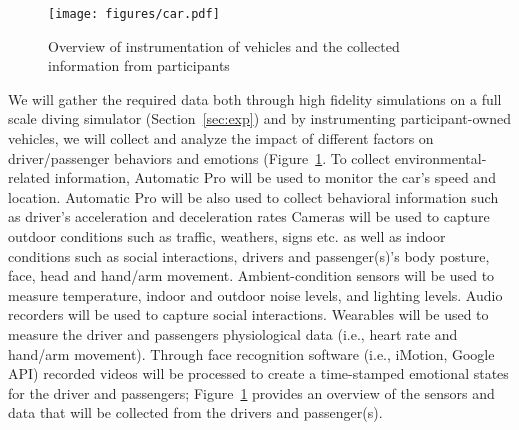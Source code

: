 \begin{figure}
    \centering
    \texttt{[image: figures/car.pdf]}
    \caption{Overview of instrumentation of vehicles and the collected information from participants}
    \label{fig:sensors}
\end{figure}
We will gather the required data both through high fidelity simulations on a full scale diving simulator (Section~\ref{sec:exp}) and by instrumenting participant-owned vehicles, we will collect and analyze the impact of different factors on driver/passenger behaviors and emotions (Figure~\ref{fig:sensors}.
To collect environmental-related information, Automatic Pro will be used to monitor the car's speed and location. 
Automatic Pro will be also used to collect behavioral information such as driver's acceleration and deceleration rates
Cameras will be used to capture outdoor conditions such as traffic, weathers, signs etc. as well as indoor conditions such as social interactions, drivers and passenger(s)'s body posture, face, head and hand/arm movement. 
Ambient-condition sensors will be used to measure temperature, indoor and outdoor noise levels, and lighting levels. 
Audio recorders will be used to capture social interactions. %
Wearables
 will be used to measure the driver and passengers physiological data (i.e., heart rate and hand/arm movement). Through face recognition software (i.e., iMotion, Google API) recorded videos will be processed to create a time-stamped emotional states for the driver and passengers; 
Figure~\ref{fig:sensors} provides an overview of the sensors and data that will be collected from the drivers and passenger(s).   


